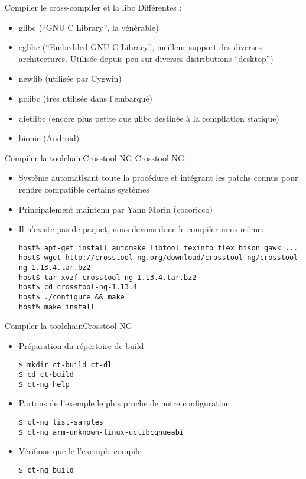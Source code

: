 \begin{frame}[fragile=singleslide]{Compiler le cross-compiler et la libc}
  Différentes :
  \begin{itemize}
  \item glibc (``GNU C Library'', la vénérable)
  \item  eglibc  (``Embedded GNU  C  Library'',  meilleur support  des
    diverses  architectures.  Utilisée  depuis peu  sur  diverses
    distributions ``desktop'')
  \item newlib (utilisée par Cygwin) 
  \item µclibc (très utilisée dans l'embarqué)
  \item  dietlibc  (encore  plus   petite  que  µlibc  destinée  à  la
    compilation statique)
  \item bionic (Android)
  \end{itemize}
\end{frame}

\begin{frame}[fragile=singleslide]{Compiler la toolchain}{Crosstool-NG}
  Crosstool-NG :
  \begin{itemize}
  \item Système automatisant toute la procédure et intégrant les patchs
    connus pour rendre compatible certains systèmes
  \item Principalement maintenu par Yann Morin (cocoricco)
  \item Il n'existe  pas de paquet, nous devons  donc le compiler nous
    même:
    \begin{lstlisting}
host% apt-get install automake libtool texinfo flex bison gawk ...
host$ wget http://crosstool-ng.org/download/crosstool-ng/crosstool-ng-1.13.4.tar.bz2
host$ tar xvzf crosstool-ng-1.13.4.tar.bz2
host$ cd crosstool-ng-1.13.4
host$ ./configure && make
host% make install
    \end{lstlisting}
  \end{itemize}
\end{frame}
   
\begin{frame}[fragile=singleslide]{Compiler la toolchain}{Crosstool-NG}
  \begin{itemize}
  \item Préparation du répertoire de build
    \begin{lstlisting}
$ mkdir ct-build ct-dl
$ cd ct-build
$ ct-ng help
    \end{lstlisting}
  \item Partons de l'exemple le plus proche de notre configuration
    \begin{lstlisting}
$ ct-ng list-samples
$ ct-ng arm-unknown-linux-uclibcgnueabi
    \end{lstlisting}
  \item Vérifions que le l'exemple compile
    \begin{lstlisting}
$ ct-ng build
    \end{lstlisting}
  \end{itemize}
\end{frame}

